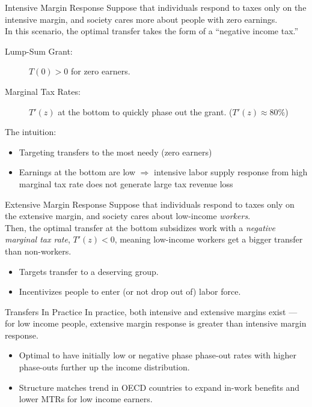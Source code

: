 \documentclass[10pt]{extarticle}
\begin{document}
  \begin{problem}{Intensive Margin Response}
    Suppose that individuals respond to taxes only on the intensive margin, and society cares more about people with zero earnings.\\

    In this scenario, the optimal transfer takes the form of a ``negative income tax.''
    \begin{description}
      \item[Lump-Sum Grant:] $T(0) > 0$ for zero earners.
      \item[Marginal Tax Rates:] $T'(z)$ at the bottom to quickly phase out the grant. ($T'(z) \approx 80\%$)
    \end{description}
    The intuition:
    \begin{itemize}
      \item Targeting transfers to the most needy (zero earners)
      \item Earnings at the bottom are low $\Rightarrow$ intensive labor supply response from high marginal tax rate does not generate large tax revenue loss
    \end{itemize}
  \end{problem}
  \begin{problem}{Extensive Margin Response}
    Suppose that individuals respond to taxes only on the extensive margin, and society cares about low-income \textit{workers}.\\

    Then, the optimal transfer at the bottom subsidizes work with a \textit{negative marginal tax rate}, $T'(z) < 0$, meaning low-income workers get a bigger transfer than non-workers.
    \begin{itemize}
      \item Targets transfer to a deserving group.
      \item Incentivizes people to enter (or not drop out of) labor force.
    \end{itemize}
  \end{problem}
  \begin{problem}{Transfers In Practice}
    In practice, both intensive and extensive margins exist --- for low income people, extensive margin response is greater than intensive margin response.
    \begin{itemize}
      \item Optimal to have initially low or negative phase phase-out rates with higher phase-outs further up the income distribution.
      \item Structure matches trend in OECD countries to expand in-work benefits and lower MTRs for low income earners.
    \end{itemize}
  \end{problem}
\end{document}

